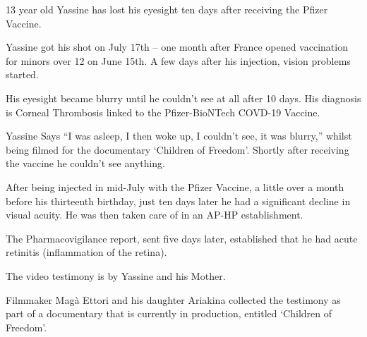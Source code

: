 13 year old Yassine has lost his eyesight ten days after receiving the Pfizer
Vaccine.

Yassine got his shot on July 17th – one month after France opened vaccination
for minors over 12 on June 15th. A few days after his injection, vision problems
started.

His eyesight became blurry until he couldn’t see at all after 10 days. His
diagnosis is Corneal Thrombosis linked to the Pfizer-BioNTech COVD-19 Vaccine.

Yassine Says “I was asleep, I then woke up, I couldn’t see, it was blurry,”
whilst being filmed for the documentary ‘Children of Freedom’. Shortly after
receiving the vaccine he couldn’t see anything.

After being injected in mid-July with the Pfizer Vaccine, a little over a month
before his thirteenth birthday, just ten days later he had a significant decline
in visual acuity. He was then taken care of in an AP-HP establishment.

The Pharmacovigilance report, sent five days later, established that he had
acute retinitis (inflammation of the retina).

The video testimony is by Yassine and his Mother.

Filmmaker Magà Ettori and his daughter Ariakina collected the testimony as part
of a documentary that is currently in production, entitled ‘Children of
Freedom’.
